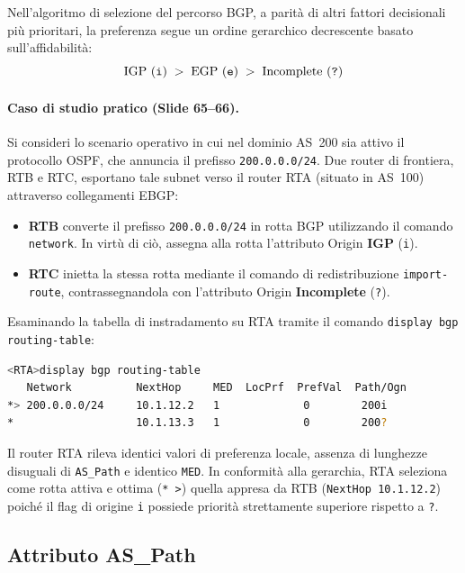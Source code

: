 \documentclass[11pt, a4paper]{article}
\begin{document}
Nell'algoritmo di selezione del percorso BGP, a parità di altri fattori decisionali più prioritari, la preferenza segue un ordine gerarchico decrescente basato sull'affidabilità:
\begin{equation}
    \text{IGP (\texttt{i})} \;>\; \text{EGP (\texttt{e})} \;>\; \text{Incomplete (\texttt{?})}
\end{equation}


\paragraph{Caso di studio pratico (Slide 65--66).}
Si consideri lo scenario operativo in cui nel dominio AS~200 sia attivo il protocollo OSPF, che annuncia il prefisso \texttt{200.0.0.0/24}. Due router di frontiera, RTB e RTC, esportano tale subnet verso il router RTA (situato in AS~100) attraverso collegamenti EBGP:
\begin{itemize}[noitemsep]
    \item \textbf{RTB} converte il prefisso \texttt{200.0.0.0/24} in rotta BGP utilizzando il comando \texttt{network}. In virtù di ciò, assegna alla rotta l'attributo Origin \textbf{IGP} (\texttt{i}).
    \item \textbf{RTC} inietta la stessa rotta mediante il comando di redistribuzione \texttt{import-route}, contrassegnandola con l'attributo Origin \textbf{Incomplete} (\texttt{?}).
\end{itemize}
Esaminando la tabella di instradamento su RTA tramite il comando \texttt{display bgp routing-table}:
\begin{lstlisting}[language=bash]
<RTA>display bgp routing-table
   Network          NextHop     MED  LocPrf  PrefVal  Path/Ogn
*> 200.0.0.0/24     10.1.12.2   1             0        200i
*                   10.1.13.3   1             0        200?
\end{lstlisting}
Il router RTA rileva identici valori di preferenza locale, assenza di lunghezze disuguali di \texttt{AS\_Path} e identico \texttt{MED}. In conformità alla gerarchia, RTA seleziona come rotta attiva e ottima (\texttt{* >}) quella appresa da RTB (\texttt{NextHop 10.1.12.2}) poiché il flag di origine \texttt{i} possiede priorità strettamente superiore rispetto a \texttt{?}.

\subsection{Attributo AS\_Path}
\end{document}
